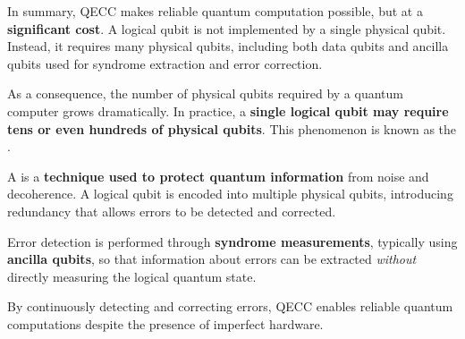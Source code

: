 \highspace
In summary, QECC makes reliable quantum computation possible, but at a \textbf{significant cost}. A logical qubit is not implemented by a single physical qubit. Instead, it requires many physical qubits, including both data qubits and ancilla qubits used for syndrome extraction and error correction.

\highspace
As a consequence, the number of physical qubits required by a quantum computer grows dramatically. In practice, a \textbf{single logical qubit may require tens or even hundreds of physical qubits}. This phenomenon is known as the .

\highspace
\begin{definitionbox}
    A  is a \textbf{technique used to protect quantum information} from noise and decoherence. A logical qubit is encoded into multiple physical qubits, introducing redundancy that allows errors to be detected and corrected.

    \highspace
    Error detection is performed through \textbf{syndrome measurements}, typically using \textbf{ancilla qubits}, so that information about errors can be extracted \emph{without} directly measuring the logical quantum state.

    \highspace
    By continuously detecting and correcting errors, QECC enables reliable quantum computations despite the presence of imperfect hardware.
\end{definitionbox}